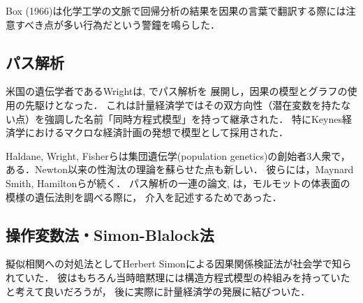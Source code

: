 \documentclass[uplatex,dvipdfmx]{jsreport}
\begin{document}
\begin{issue}
    Box (1966)は化学工学の文脈で回帰分析の結果を因果の言葉で翻訳する際には注意すべき点が多い行為だという警鐘を鳴らした\cite{Cox-Wermuth04-review}．
\end{issue}

\subsection{パス解析}

\begin{tcolorbox}[colframe=ForestGreen, colback=ForestGreen!10!white,breakable,colbacktitle=ForestGreen!40!white,coltitle=black,fonttitle=\bfseries\sffamily,
title=]
    米国の遺伝学者であるWrightは\cite{Wright18}, \cite{Wright21}でパス解析を
    展開し，因果の模型とグラフの使用の先駆けとなった．
    これは計量経済学ではその双方向性（潜在変数を持たない点）を強調した名前「同時方程式模型」を持って継承された\cite{豊田秀樹-理論編}．
    特にKeynes経済学におけるマクロな経済計画の発想で模型として採用された\cite{統計科学のフロンティア5}．
\end{tcolorbox}

\begin{history}
    Haldane, Wright, Fisherらは集団遺伝学(population genetics)の創始者3人衆で，
    ある．Newton以来の性淘汰の理論を蘇らせた点も新しい．
    彼らには，Maynard Smith, Hamiltonらが続く．
    パス解析の一連の論文\cite{Wright18}, \cite{Wright21}は，モルモットの体表面の模様の遺伝法則を調べる際に，
    介入を記述するためであった．
\end{history}

\subsection{操作変数法・Simon-Blalock法}

\begin{tcolorbox}[colframe=ForestGreen, colback=ForestGreen!10!white,breakable,colbacktitle=ForestGreen!40!white,coltitle=black,fonttitle=\bfseries\sffamily,
title=]
    擬似相関への対処法としてHerbert Simonによる因果関係検証法が社会学で知られていた．
    彼はもちろん当時暗黙理には構造方程式模型の枠組みを持っていたと考えて良いだろうが\cite{Asher83-Causal}，
    後に実際に計量経済学の発展に結びついた．
\end{tcolorbox}
\end{document}
